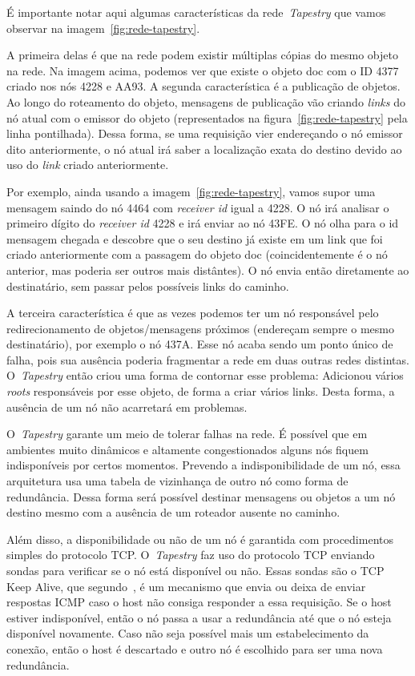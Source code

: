 É importante notar aqui algumas características da rede~\emph{Tapestry} que vamos observar na imagem~\ref{fig:rede-tapestry}.

A primeira delas é que na rede podem existir múltiplas cópias do mesmo objeto na rede. Na imagem acima, podemos ver que existe o objeto doc com o ID 4377 criado nos nós 4228 e AA93. A segunda característica é a publicação de objetos. Ao longo do roteamento do objeto, mensagens de publicação vão criando \emph{links} do nó atual com o emissor do objeto (representados na figura~\ref{fig:rede-tapestry} pela linha pontilhada). Dessa forma, se uma requisição vier endereçando o nó emissor dito anteriormente, o nó atual irá saber a localização exata do destino devido ao uso do \emph{link} criado anteriormente.

Por exemplo, ainda usando a imagem~\ref{fig:rede-tapestry}, vamos supor uma mensagem saindo do nó 4464 com \emph{receiver id} igual a 4228. O nó irá analisar o primeiro dígito do \emph{receiver id} 4228 e irá enviar ao nó 43FE. O nó olha para o id mensagem chegada e descobre que o seu destino já existe em um link que foi criado anteriormente com a passagem do objeto doc (coincidentemente é o nó anterior, mas poderia ser outros mais distântes). O nó envia então diretamente ao destinatário, sem passar pelos possíveis links do caminho.

A terceira característica é que as vezes podemos ter um nó responsável pelo redirecionamento de objetos/mensagens próximos (endereçam sempre o mesmo destinatário), por exemplo o nó 437A. Esse nó acaba sendo um ponto único de falha, pois sua ausência poderia fragmentar a rede em duas outras redes distintas. O~\emph{Tapestry} então criou uma forma de contornar esse problema: Adicionou vários \emph{roots} responsáveis por esse objeto, de forma a criar vários links. Desta forma, a ausência de um nó não acarretará em problemas.

O~\emph{Tapestry} garante um meio de tolerar falhas na rede. É possível que em ambientes muito dinâmicos e altamente congestionados alguns nós fiquem indisponíveis por certos momentos. Prevendo a indisponibilidade de um nó, essa arquitetura usa uma tabela de vizinhança de outro nó como forma de redundância. Dessa forma será possível destinar mensagens ou objetos a um nó destino mesmo com a ausência de um roteador ausente no caminho.

Além disso, a disponibilidade ou não de um nó é garantida com procedimentos simples do protocolo TCP. O~\emph{Tapestry} faz uso do protocolo TCP enviando sondas para verificar se o nó está disponível ou não. Essas sondas são o TCP Keep Alive, que segundo~\cite{stevens93}, é um mecanismo que envia ou deixa de enviar respostas ICMP caso o host não consiga responder a essa requisição. Se o host estiver indisponível, então o nó passa a usar a redundância até que o nó esteja disponível novamente. Caso não seja possível mais um estabelecimento da conexão, então o host é descartado e outro nó é escolhido para ser uma nova redundância.

